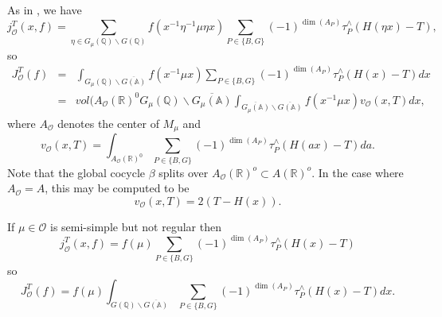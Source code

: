 As in \cite{A2}, we have 
\begin{equation}\label{eq:4.9}
j_{{\mathcal{O}}}^T(x,f)=
\sum_{\eta \in G_\mu ({\mathbb{Q}})\backslash G({\mathbb{Q}})}
f(x^{-1}\eta ^{-1}\mu \eta x)\sum_{P\in \{B,G\}}(-1)^{\dim (A_P)}
\tau_P^{\wedge }(H(\eta x)-T),
\end{equation}
so 
\begin{eqnarray}
J_{{\mathcal{O}}}^T(f)
&=&\int_{G_\mu ({\mathbb{Q}})\backslash \overline{G({\mathbb{A}})}}
f(x^{-1}\mu x)\sum_{P\in \{B,G\}}(-1)^{\dim (A_P)}
\tau _P^{\wedge}(H(x)-T)dx \label{eq:4.10}\\
&=&vol(A_{{\mathcal{O}}}({\mathbb{R}})^0G_\mu ({\mathbb{Q}})
\backslash \overline{G_\mu ({\mathbb{A}})}
\int_{\overline{G_\mu ({\mathbb{A}})}\backslash \overline{G({\mathbb{A}})}}
f(x^{-1}\mu x)v_{{\mathcal{O}}}(x,T)dx,  \nonumber
\end{eqnarray}
where $A_{{\mathcal{O}}}$ denotes the center of $M_\mu $ and 
\[
v_{{\mathcal{O}}}(x,T)
=\int_{A_{{\mathcal{O}}}({\mathbb{R}})^0}\sum_{P\in
\{B,G\}}(-1)^{\dim (A_P)}\tau _P^{\wedge }(H(ax)-T)da. 
\]
Note that the global cocycle $\beta $ splits over
$A_{{\mathcal{O}}}({\mathbb{R}})^o\subset A({\mathbb{R}})^o$.
In the case where $A_{\mathcal{O}}=A$, this may be
computed to be 
\[
v_{{\mathcal{O}}}(x,T)=2(T-H(x)). 
\]

If $\mu \in {\mathcal{O}}$ is semi-simple but not regular then 
\[
j_{{\mathcal{O}}}^T(x,f)
=f(\mu )\sum_{P\in \{B,G\}}(-1)^{\dim (A_P)}
\tau_P^{\wedge }(H(x)-T) 
\]
so 
\begin{equation}
J_{{\mathcal{O}}}^T(f)=f(\mu )
\int_{G({\mathbb{Q}})\backslash \overline{G({\mathbb{A}})}}
\sum_{P\in \{B,G\}}(-1)^{\dim (A_P)}
\tau _P^{\wedge }(H(x)-T)dx.  \nonumber
\end{equation}



